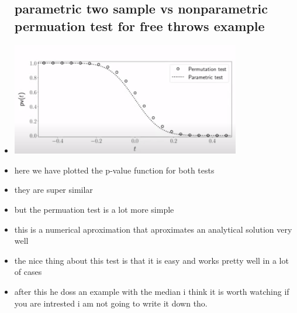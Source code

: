 \documentclass{article}
\begin{document}
\begin{itemize}
\subsection{parametric two sample vs nonparametric permuation test for free throws example}
\item \includegraphics[width=10cm]{notes/week_7/vedio_1/immages/vedio-1-3.png}
\item here we have plotted the p-value function for both tests 
\item they are super similar 
\item but the permuation test is a lot more simple 
\item this is a numerical aproximation that aproximates an analytical solution very well 
\item the nice thing about this test is that it is easy and works pretty well in a lot of cases 
\item after this he doss an example with the median i think it is worth watching if you are intrested i am not going to write it down tho. 



\end{itemize}
\end{document}
